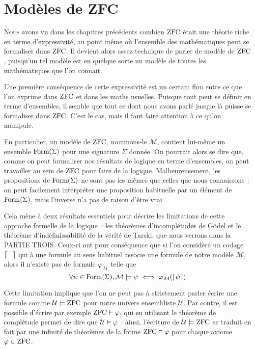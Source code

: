 \chapter{Modèles de ZFC}
\label{chp.modZFC}

\minitoc

\lettrine{N}{ous} avons vu dans les chapitres précédents combien $\operatorname{ZFC}$ était
une théorie riche en terme d'expressivité, au point même où l'ensemble des
mathématiques peut se formaliser dans $\operatorname{ZFC}$. Il devient alors assez technique
de parler de modèle de $\operatorname{ZFC}$, puisqu'un tel modèle est en quelque sorte un
modèle de toutes les mathématiques que l'on connait.

Une première conséquence de cette expressivité est un certain flou entre ce que
l'on exprime dans $\operatorname{ZFC}$ et dans les maths usuelles. Puisque tout peut se
définir en terme d'ensembles, il semble que tout ce dont nous avons parlé jusque
là puisse se formaliser dans $\operatorname{ZFC}$. C'est le cas, mais il faut faire attention
à ce qu'on manipule.

En particulier, un modèle de $\operatorname{ZFC}$, nommons-le $\mathcal M$, contient lui-même
un ensemble $\operatorname{Form}(\Sigma)$ pour une signature $\Sigma$ donnée. On pourrait
alors se dire que, comme on peut formaliser nos résultats de logique en terme
d'ensembles, on peut travailler au sein de $\operatorname{ZFC}$ pour faire de la logique.
Malheureusement, les propositions de $\operatorname{Form}(\Sigma)$ ne sont pas les mêmes
que celles que nous connaissons~: on peut facilement interpréter une proposition
habituelle par un élément de $\operatorname{Form}(\Sigma)$, mais l'inverse n'a pas de
raison d'être vrai.

Cela mène à deux résultats essentiels pour décrire les limitations de cette
approche formelle de la logique~: les théorèmes d'incomplétudes de Gödel et le
théorème d'indéfinissabilité de la vérité de Tarski, que nous verrons dans la
PARTIE TROIS. Ceux-ci ont pour conséquence que si l'on considère un codage
$\lceil-\rceil$ qui à une formule au sens habituel associe une formule de notre
modèle $\mathcal M$, alors il n'existe pas de formule $\varphi_{\mathcal M}$
telle que
\[\forall \psi \in \operatorname{Form}(\Sigma), \mathcal M \models \psi
\iff \mathcal \varphi_{\mathcal M}(\lceil\psi\rceil)\]

Cette limitation implique que l'on ne peut pas à strictement
parler écrire une formule comme $\mathcal U\models \operatorname{ZFC}$ pour notre univers
ensembliste $\mathcal U$. Par contre, il est possible d'écrire par exemple
$\operatorname{ZFC}\vdash \varphi$, qui en utilisant le théorème de complétude permet de dire
que $\mathcal U \models \varphi$~: ainsi, l'écriture de $\mathcal U\models\operatorname{ZFC}$
se traduit en fait par une infinité de théorèmes de la forme
$\operatorname{ZFC}\vDash \varphi$ pour chaque axiome $\varphi \in \operatorname{ZFC}$.

